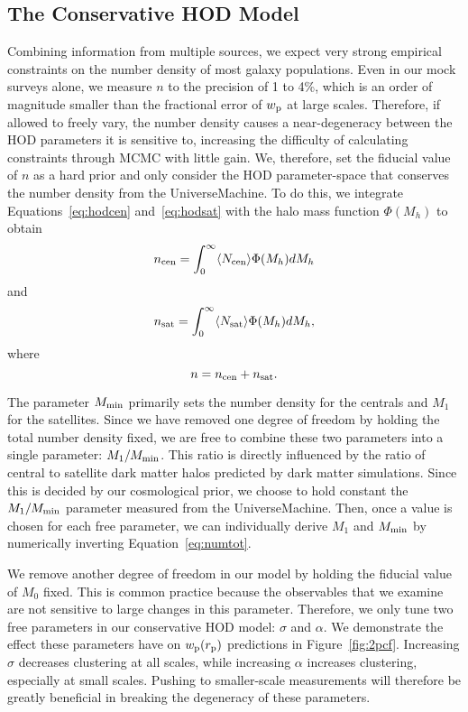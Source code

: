 \documentclass[twocolumn,twocolappendix]{aastex63}
\begin{document}
\subsection{The Conservative HOD Model}
\label{sec:conservative-hod}

Combining information from multiple sources, we expect very strong empirical constraints on the number density of most galaxy populations. Even in our mock surveys alone, we measure $n$ to the precision of 1 to 4\%, which is an order of magnitude smaller than the fractional error of $w_{\rm p}$ at large scales. Therefore, if allowed to freely vary, the number density causes a near-degeneracy between the HOD parameters it is sensitive to, increasing the difficulty of calculating constraints through MCMC with little gain.
We, therefore, set the fiducial value of $n$ as a hard prior and only consider the HOD parameter-space that conserves the number density from the UniverseMachine.
To do this, we integrate Equations~\ref{eq:hodcen} and~\ref{eq:hodsat} with the halo mass function $\Phi(M_h)$ to obtain
\begin{equation} \label{eq:numcen}
\begin{split}
n_{{\rm cen}} = \int_0^\infty \langle N_{{\rm cen}} \rangle \Phi(M_h) dM_h
\end{split}
\end{equation}
and
\begin{equation} \label{eq:numsat}
n_{{\rm sat}} = \int_0^\infty \langle N_{{\rm sat}} \rangle \Phi(M_h) dM_h,
\end{equation}
where
\begin{equation} \label{eq:numtot}
n = n_{{\rm cen}} + n_{{\rm sat}}.
\end{equation}

The parameter $M_{\rm min}$ primarily sets the number density for the centrals and $M_1$ for the satellites. Since we have removed one degree of freedom by holding the total number density fixed, we are free to combine these two parameters into a single parameter: $M_1/M_{\rm min}$. 
This ratio is directly influenced by the ratio of central to satellite dark matter halos predicted by dark matter simulations. Since this is decided by our cosmological prior, we choose to hold constant the $M_1/M_{\rm min}$ parameter measured from the UniverseMachine. Then, once a value is chosen for each free parameter, we can individually derive $M_1$ and $M_{\rm min}$ by numerically inverting Equation~\ref{eq:numtot}.

We remove another degree of freedom in our model by holding the fiducial value of $M_0$ fixed. This is common practice because the observables that we examine are not sensitive to large changes in this parameter.
Therefore, we only tune two free parameters in our conservative HOD model: $\sigma$ and $\alpha$. We demonstrate the effect these parameters have on $w_{\rm p}(r_{\rm p})$ predictions in Figure~\ref{fig:2pcf}. Increasing $\sigma$ decreases clustering at all scales, while increasing $\alpha$ increases clustering, especially at small scales. Pushing to smaller-scale measurements will therefore be greatly beneficial in breaking the degeneracy of these parameters.
\end{document}

